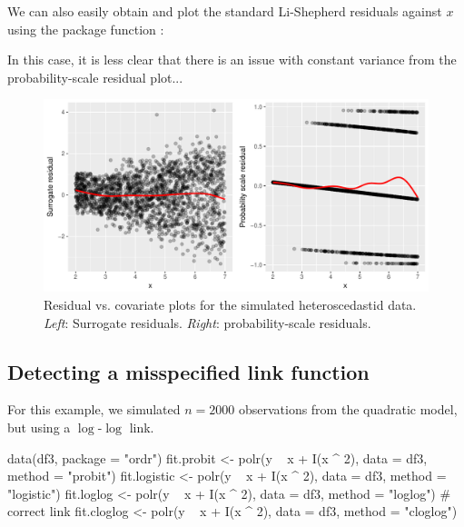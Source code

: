 We can also easily obtain and plot the standard Li-Shepherd residuals against $x$ using the  package function :

In this case, it is less clear that there is an issue with constant variance from the probability-scale residual plot...

\begin{figure}[!htbp]
  \centering
  \includegraphics[width=1\textwidth]{heteroscedasticity}
  \caption{Residual vs. covariate plots for the simulated heteroscedastid data. \textit{Left}: Surrogate residuals. \textit{Right}: probability-scale residuals.}
  \label{fig:heteroscedasticity}
\end{figure}


\subsection{Detecting a misspecified link function}

For this example, we simulated $n = 2000$ observations from the quadratic model, but using a $\log$-$\log$ link.

\begin{example}
data(df3, package = "ordr")
fit.probit <- polr(y ~ x + I(x ^ 2), data = df3, method = "probit")
fit.logistic <- polr(y ~ x + I(x ^ 2), data = df3, method = "logistic")
fit.loglog <- polr(y ~ x + I(x ^ 2), data = df3, method = "loglog")  # correct link
fit.cloglog <- polr(y ~ x + I(x ^ 2), data = df3, method = "cloglog")
\end{example}


